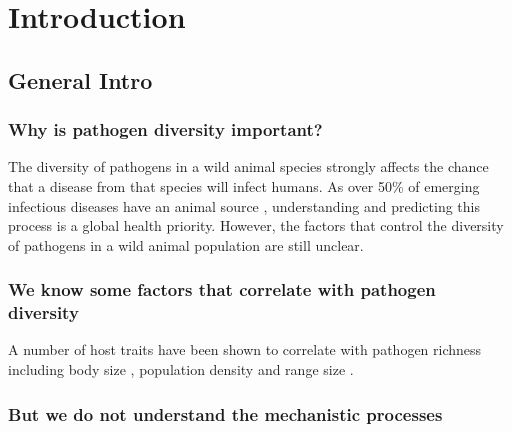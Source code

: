 
\clearpage
\section{Introduction}





\subsection{General Intro}


\subsubsection{Why is pathogen diversity important?}

The diversity of pathogens in a wild animal species strongly affects the chance that a disease from that species will infect humans.
As over 50\% of emerging infectious diseases have an animal source  \cite{jones2008global}, understanding and predicting this process is a global health priority.
However, the factors that control the diversity of pathogens in a wild animal population are still unclear.


\subsubsection{We know some factors that correlate with pathogen diversity}
A number of host traits have been shown to correlate with pathogen richness including body size  \cite{kamiya2014determines, arneberg2002host}, population density \cite{nunn2003comparative, arneberg2002host} and range size \cite{bordes2011impact, kamiya2014determines}.




\subsubsection{But we do not understand the mechanistic processes}

